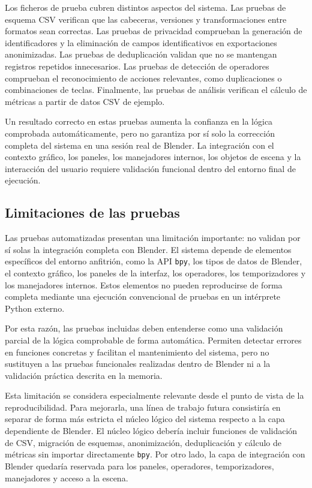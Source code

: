 Los ficheros de prueba cubren distintos aspectos del sistema. Las pruebas de esquema CSV verifican que las cabeceras, versiones y transformaciones entre formatos sean correctas. Las pruebas de privacidad comprueban la generación de identificadores y la eliminación de campos identificativos en exportaciones anonimizadas. Las pruebas de deduplicación validan que no se mantengan registros repetidos innecesarios. Las pruebas de detección de operadores comprueban el reconocimiento de acciones relevantes, como duplicaciones o combinaciones de teclas. Finalmente, las pruebas de análisis verifican el cálculo de métricas a partir de datos CSV de ejemplo.

Un resultado correcto en estas pruebas aumenta la confianza en la lógica comprobada automáticamente, pero no garantiza por sí solo la corrección completa del sistema en una sesión real de Blender. La integración con el contexto gráfico, los paneles, los manejadores internos, los objetos de escena y la interacción del usuario requiere validación funcional dentro del entorno final de ejecución.

\subsection{Limitaciones de las pruebas}
\label{subsec:d-limitaciones-pruebas}

Las pruebas automatizadas presentan una limitación importante: no validan por sí solas la integración completa con Blender. El sistema depende de elementos específicos del entorno anfitrión, como la API \texttt{bpy}, los tipos de datos de Blender, el contexto gráfico, los paneles de la interfaz, los operadores, los temporizadores y los manejadores internos. Estos elementos no pueden reproducirse de forma completa mediante una ejecución convencional de pruebas en un intérprete Python externo.

Por esta razón, las pruebas incluidas deben entenderse como una validación parcial de la lógica comprobable de forma automática. Permiten detectar errores en funciones concretas y facilitan el mantenimiento del sistema, pero no sustituyen a las pruebas funcionales realizadas dentro de Blender ni a la validación práctica descrita en la memoria.

Esta limitación se considera especialmente relevante desde el punto de vista de la reproducibilidad. Para mejorarla, una línea de trabajo futura consistiría en separar de forma más estricta el núcleo lógico del sistema respecto a la capa dependiente de Blender. El núcleo lógico debería incluir funciones de validación de CSV, migración de esquemas, anonimización, deduplicación y cálculo de métricas sin importar directamente \texttt{bpy}. Por otro lado, la capa de integración con Blender quedaría reservada para los paneles, operadores, temporizadores, manejadores y acceso a la escena.

